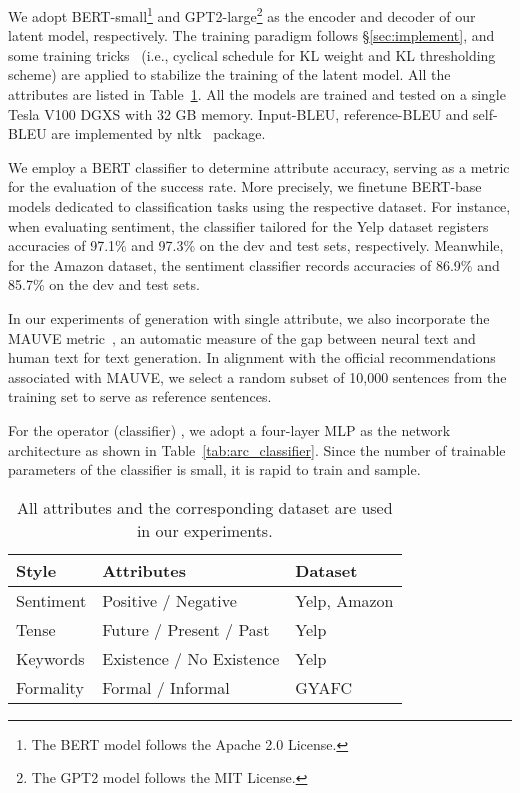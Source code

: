 \documentclass[11pt]{article}
\begin{document}
We adopt BERT-small\footnote{The BERT model follows the Apache 2.0 License.} and GPT2-large\footnote{The GPT2 model follows the MIT License.}  as the encoder and decoder of our latent model, respectively. The training paradigm follows \S\ref{sec:implement}, and some training tricks~\cite{li-etal-2020-optimus} (i.e., cyclical schedule for KL weight and KL thresholding scheme) are applied to stabilize the training of the latent model. All the attributes are listed in Table~\ref{tab:operators}. 
All the models are trained and tested on a single Tesla V100 DGXS with 32 GB memory.
Input-BLEU, reference-BLEU and self-BLEU are implemented by nltk~\cite{DBLP:books/daglib/0022921} package. 



We employ a BERT classifier to determine attribute accuracy, serving as a metric for the evaluation of the success rate. More precisely, we finetune BERT-base models dedicated to classification tasks using the respective dataset. For instance, when evaluating sentiment, the classifier tailored for the Yelp dataset registers accuracies of 97.1\% and 97.3\% on the dev and test sets, respectively. Meanwhile, for the Amazon dataset, the sentiment classifier records accuracies of 86.9\% and 85.7\% on the dev and test sets.

In our experiments of generation with single attribute, we also incorporate the MAUVE metric~\citep{pillutla2021mauve}, an automatic measure of the gap between neural text and human text for text generation. In alignment with the official recommendations associated with MAUVE, we select a random subset of 10,000 sentences from the training set to serve as reference sentences.

For the operator (classifier) , we adopt a four-layer MLP as the network architecture as shown in Table~\ref{tab:arc_classifier}. Since the number of trainable parameters of the classifier is small, it is rapid to train and sample. 
\begin{table}[ht]
    \centering
\begin{tabular}{l|l |l}
    \toprule
        Style & Attributes  & Dataset\\\midrule
         Sentiment& Positive / Negative  &Yelp, Amazon\\Tense& Future / Present / Past & Yelp \\
Keywords& Existence / No Existence & Yelp\\Formality & Formal / Informal & GYAFC \\
\bottomrule
    \end{tabular}
    \caption{All attributes and the corresponding dataset are used in our experiments.} \label{tab:operators}
\end{table}
\end{document}
